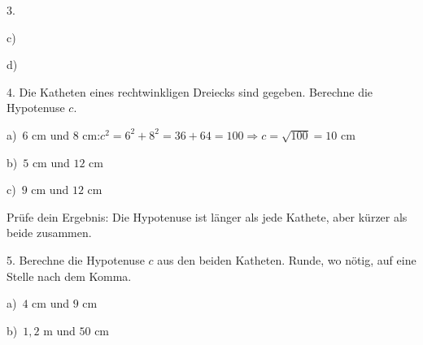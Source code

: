 \documentclass[11pt]{article}
\newcommand{\grau}[1]{{\color{mbgrau}#1}}
\begin{document}
\begin{pfaufg}{}{3.}{}
\begin{minipage}[b]{0.245\linewidth}
{\small c)}\linie{28mm}
\end{minipage}\hfill
\begin{minipage}[b]{0.245\linewidth}\centering
{}\par\smallskip
{\small d)}\linie{28mm}
\end{minipage}
\end{pfaufg}

\begin{pfaufg}{}{4.}{}
Die Katheten eines rechtwinkligen Dreiecks sind gegeben. Berechne die Hypotenuse $c$.\par\medskip
\grau{a)\ $6$ cm und $8$ cm:\quad $c^2 = 6^2 + 8^2 = 36 + 64 = 100$\quad $\Rightarrow$\quad $c = \sqrt{100} = 10$ cm}\par\medskip
\noindent\begin{minipage}[t]{0.48\linewidth}
b)\ $5$ cm und $12$ cm
\end{minipage}\hfill
\begin{minipage}[t]{0.48\linewidth}
c)\ $9$ cm und $12$ cm
\end{minipage}
\par Prüfe dein Ergebnis: Die Hypotenuse ist länger als jede Kathete, aber kürzer als beide zusammen.
\end{pfaufg}

\begin{pfaufg}{}{5.}{}
Berechne die Hypotenuse $c$ aus den beiden Katheten. Runde, wo nötig, auf eine Stelle nach dem Komma.\par\smallskip
\noindent\begin{minipage}[t]{0.48\linewidth}
a)\ $4$ cm und $9$ cm
\end{minipage}\hfill
\begin{minipage}[t]{0.48\linewidth}
b)\ $1{,}2$ m und $50$ cm
\end{minipage}
\end{pfaufg}
\end{document}
